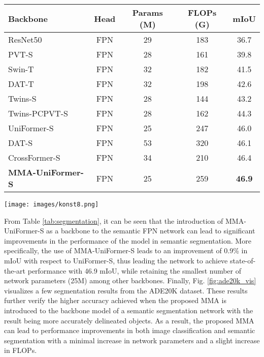 \documentclass[10pt,twocolumn,letterpaper]{article}
\begin{document}
\begin{table*}[t]
\centering
\caption{Comparative evaluation on semantic segmentation using ADE20K.}
\label{tab:segmentation}
\setlength{\tabcolsep}{26pt}
\begin{tabular}{lcccc}
\hline
\textbf{Backbone} & \textbf{Head} & \textbf{Params (M)}  & \textbf{FLOPs (G)} & \textbf{mIoU}\\
\hline
ResNet50 \cite{Author61} & FPN & 29 & 183 & 36.7\\
PVT-S \cite{Author10} & FPN & 28 & 161 & 39.8\\
Swin-T \cite{Author9} & FPN & 32 & 182 & 41.5\\
DAT-T \cite{Author67} & FPN & 32 & 198 & 42.6\\
Twins-S \cite{Author66} & FPN & 28 & 144 & 43.2\\
Twins-PCPVT-S \cite{Author66} & FPN & 28 & 162 & 44.3\\
UniFormer-S \cite{Author57} & FPN & 25 & 247 & 46.0\\
DAT-S \cite{Author67} & FPN& 53 & 320 & 46.1\\
CrossFormer-S \cite{Author64} & FPN & 34 & 210 & 46.4\\
\textbf{MMA-UniFormer-S} & FPN & 25 & 259 & \textbf{46.9}\\
\hline
\end{tabular}
\end{table*}

\begin{figure*}[t]
  \centering
  \texttt{[image: images/konst8.png]}
  \caption{Semantic segmentation results in ADE20K. The first row depicts the original images, the second row shows the ground truth segmentation, while the third and fourth rows depict the segmentation results from the UniFormer-S + FPN and the MMA-UniFormer-S + FPN networks, respectively.}
  \label{fig:ade20k_vis}
\end{figure*}

From Table \ref{tab:segmentation}, it can be seen that the introduction of MMA-UniFormer-S as a backbone to the semantic FPN network can lead to significant improvements in the performance of the model in semantic segmentation. More specifically, the use of MMA-UniFormer-S leads to an improvement of 0.9\% in mIoU with respect to UniFormer-S, thus leading the network to achieve state-of-the-art performance with 46.9 mIoU, while retaining the smallest number of network parameters (25M) among other backbones. Finally, Fig. \ref{fig:ade20k_vis} visualizes a few segmentation results from the ADE20K dataset. These results further verify the higher accuracy achieved when the proposed MMA is introduced to the backbone model of a semantic segmentation network with the result being more accurately delineated objects. As a result, the proposed MMA can lead to performance improvements in both image classification and semantic segmentation with a minimal increase in network parameters and a slight increase in FLOPs.
\end{document}
